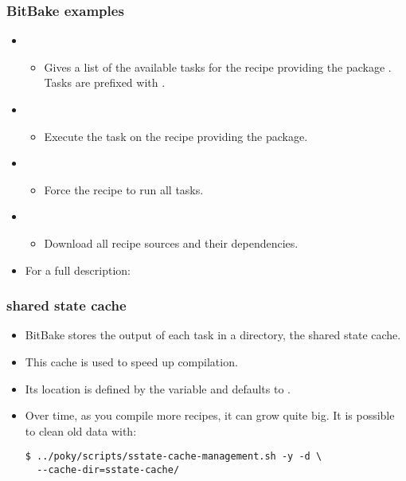 \begin{frame}
  \frametitle{BitBake examples}
  \begin{itemize}
    \item {}
    \begin{itemize}
      \item Gives a list of the available tasks for the recipe
        providing the package . Tasks are
        prefixed with .
    \end{itemize}
    \item {}
    \begin{itemize}
      \item Execute the task  on the recipe providing
        the  package.
    \end{itemize}
    \item {}
    \begin{itemize}
      \item Force the  recipe to run all tasks.
    \end{itemize}
    \item {}
    \begin{itemize}
      \item Download all recipe sources and their dependencies.
    \end{itemize}
    \item For a full description: 
  \end{itemize}
\end{frame}

\begin{frame}[fragile]
  \frametitle{shared state cache}
  \begin{itemize}
    \item BitBake stores the output of each task in a directory, the
      shared state cache.
    \item This cache is used to speed up compilation.
    \item Its location is defined by the  variable and
      defaults to .
    \item Over time, as you compile more recipes, it can grow quite
      big. It is possible to clean old data with:
      \begin{block}{}
        \begin{verbatim}
$ ../poky/scripts/sstate-cache-management.sh -y -d \
  --cache-dir=sstate-cache/
        \end{verbatim}
      \end{block}
  \end{itemize}
\end{frame}
